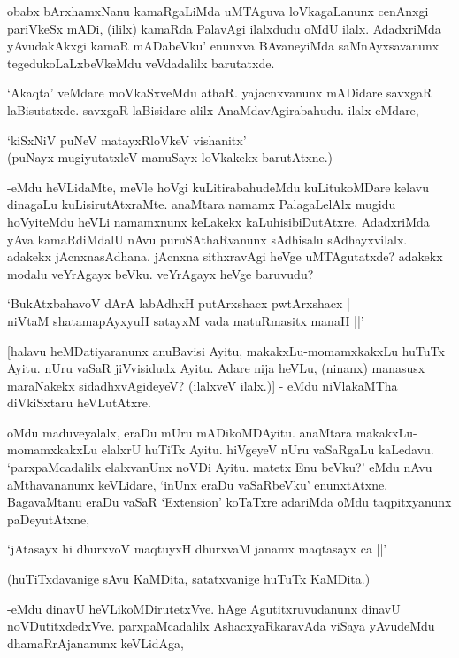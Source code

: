 obabx bArxhamxNanu kamaRgaLiMda uMTAguva loVkagaLanunx cenAnxgi pariVkeSx mADi, (ililx) kamaRda PalavAgi ilalxdudu oMdU ilalx. AdadxriMda yAvudakAkxgi kamaR mADabeVku' enunxva BAvaneyiMda saMnAyxsavanunx tegedukoLaLxbeVkeMdu veVdadalilx barutatxde.

`Akaqta' veMdare moVkaSxveMdu athaR. yajacnxvanunx mADidare savxgaR laBisutatxde. savxgaR laBisidare alilx AnaMdavAgirabahudu. ilalx eMdare,

\begin{shloka}
`kiSxNiV puNeV matayxRloVkeV vishanitx'\\
(puNayx mugiyutatxleV manuSayx loVkakekx barutAtxne.)
\end{shloka}

-eMdu heVLidaMte, meVle hoVgi kuLitirabahudeMdu kuLitukoMDare kelavu dinagaLu kuLisirutAtxraMte. anaMtara namamx PalagaLelAlx mugidu hoVyiteMdu heVLi namamxnunx keLakekx kaLuhisibiDutAtxre. AdadxriMda yAva kamaRdiMdalU nAvu puruSAthaRvanunx sAdhisalu sAdhayxvilalx. adakekx jAcnxnasAdhana. jAcnxna sithxravAgi heVge uMTAgutatxde? adakekx modalu veYrAgayx beVku. veYrAgayx heVge baruvudu?

\begin{shloka}
`BukAtxbahavoV dArA labAdhxH putArxshacx pwtArxshacx |\\
niVtaM shatamapAyxyuH satayxM vada matuRmasitx manaH ||'
\end{shloka}

[halavu heMDatiyaranunx anuBavisi Ayitu, makakxLu-momamxkakxLu huTuTx Ayitu. nUru vaSaR jiVvisidudx Ayitu. Adare nija heVLu,  (ninanx) manasusx maraNakekx sidadhxvAgideyeV? (ilalxveV ilalx.)] - eMdu niVlakaMTha diVkiSxtaru heVLutAtxre.

oMdu maduveyalalx, eraDu mUru mADikoMDAyitu. anaMtara makakxLu-momamxkakxLu elalxrU huTiTx Ayitu. hiVgeyeV nUru vaSaRgaLu kaLedavu. `parxpaMcadalilx elalxvanUnx noVDi Ayitu. matetx Enu beVku?' eMdu nAvu aMthavananunx keVLidare, `inUnx eraDu vaSaRbeVku' enunxtAtxne. BagavaMtanu eraDu vaSaR `{\eng Extension}' koTaTxre adariMda oMdu taqpitxyanunx paDeyutAtxne,

\begin{shloka}
`jAtasayx hi dhurxvoV maqtuyxH dhurxvaM janamx maqtasayx ca ||'
\end{shloka}

(huTiTxdavanige sAvu KaMDita, satatxvanige huTuTx KaMDita.)

-eMdu dinavU heVLikoMDirutetxVve. hAge Agutitxruvudanunx dinavU noVDutitxdedxVve. parxpaMcadalilx AshacxyaRkaravAda viSaya yAvudeMdu dhamaRrAjananunx keVLidAga,

